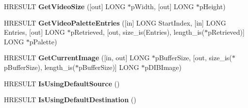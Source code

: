 \begin{DoxyCompactItemize}
\item 
\mbox{\label{interface_quartz_type_lib_1_1_i_basic_video_a0e45b05bef1a98cfb98437955aa0a722}} 
H\+R\+E\+S\+U\+LT {\bfseries Get\+Video\+Size} (\mbox{[}out\mbox{]} L\+O\+NG $\ast$p\+Width, \mbox{[}out\mbox{]} L\+O\+NG $\ast$p\+Height)
\item 
\mbox{\label{interface_quartz_type_lib_1_1_i_basic_video_a11f8fb4119cc9ac38290ac9613bebd7b}} 
H\+R\+E\+S\+U\+LT {\bfseries Get\+Video\+Palette\+Entries} (\mbox{[}in\mbox{]} L\+O\+NG Start\+Index, \mbox{[}in\mbox{]} L\+O\+NG Entries, \mbox{[}out\mbox{]} L\+O\+NG $\ast$p\+Retrieved, \mbox{[}out, size\+\_\+is(Entries), length\+\_\+is($\ast$p\+Retrieved)\mbox{]} L\+O\+NG $\ast$p\+Palette)
\item 
\mbox{\label{interface_quartz_type_lib_1_1_i_basic_video_a2a56c1a238dd54ff08218e5b7b367134}} 
H\+R\+E\+S\+U\+LT {\bfseries Get\+Current\+Image} (\mbox{[}in, out\mbox{]} L\+O\+NG $\ast$p\+Buffer\+Size, \mbox{[}out, size\+\_\+is($\ast$p\+Buffer\+Size), length\+\_\+is($\ast$p\+Buffer\+Size)\mbox{]} L\+O\+NG $\ast$p\+D\+I\+B\+Image)
\item 
\mbox{\label{interface_quartz_type_lib_1_1_i_basic_video_afff4aa9a77141d9a4cf271e1b1d7df79}} 
H\+R\+E\+S\+U\+LT {\bfseries Is\+Using\+Default\+Source} ()
\item 
\mbox{\label{interface_quartz_type_lib_1_1_i_basic_video_a673f7659b3684175983e02d8b393f764}} 
H\+R\+E\+S\+U\+LT {\bfseries Is\+Using\+Default\+Destination} ()
\end{DoxyCompactItemize}
